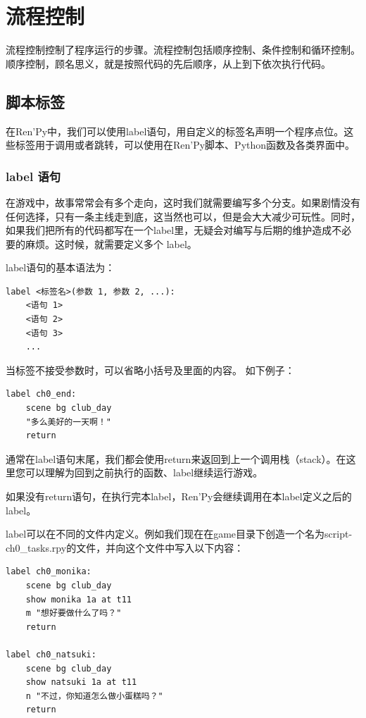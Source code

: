 \documentclass[../../Main.tex]{subfiles}
\begin{document}
\section{流程控制}
流程控制控制了程序运行的步骤。流程控制包括顺序控制、条件控制和循环控制。顺序控制，顾名思义，就是按照代码的先后顺序，从上到下依次执行代码。

\subsection{脚本标签}
在Ren'Py中，我们可以使用label语句，用自定义的标签名声明一个程序点位。这些标签用于调用或者跳转，可以使用在Ren'Py脚本、Python函数及各类界面中。

\subsubsection{label 语句}
在游戏中，故事常常会有多个走向，这时我们就需要编写多个分支。如果剧情没有任何选择，只有一条主线走到底，这当然也可以，但是会大大减少可玩性。同时，如果我们把所有的代码都写在一个label里，无疑会对编写与后期的维护造成不必要的麻烦。这时候，就需要定义多个 label。

label语句的基本语法为：
\begin{lstlisting}
label <标签名>(参数 1, 参数 2, ...):
    <语句 1>
    <语句 2>
    <语句 3>
    ...
\end{lstlisting}

当标签不接受参数时，可以省略小括号及里面的内容。
如下例子：
\begin{lstlisting}
label ch0_end:
    scene bg club_day
    "多么美好的一天啊！"
    return
\end{lstlisting}

\begin{Warning}

    通常在label语句末尾，我们都会使用return来返回到上一个调用栈（stack）。在这里您可以理解为回到之前执行的函数、label继续运行游戏。

    如果没有return语句，在执行完本label，Ren'Py会继续调用在本label定义之后的label。
\end{Warning}

label可以在不同的文件内定义。例如我们现在在game目录下创造一个名为script-ch0\_tasks.rpy的文件，并向这个文件中写入以下内容：
\begin{lstlisting}[caption=script-ch0\_tasks.rpy]
label ch0_monika:
    scene bg club_day
    show monika 1a at t11
    m "想好要做什么了吗？"
    return

label ch0_natsuki:
    scene bg club_day
    show natsuki 1a at t11
    n "不过，你知道怎么做小蛋糕吗？"
    return
\end{lstlisting}
\end{document}
